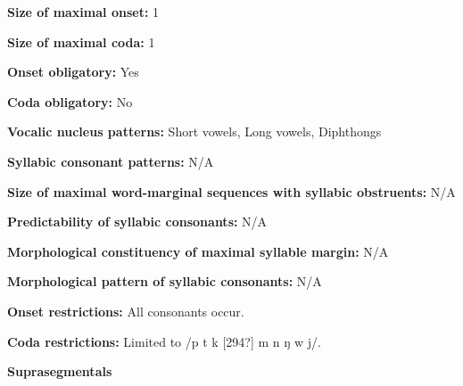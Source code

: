 \begin{styleBody}
\textbf{Size of maximal onset:} 1
\end{styleBody}

\begin{styleBody}
\textbf{Size of maximal coda:} 1
\end{styleBody}

\begin{styleBody}
\textbf{Onset obligatory:} Yes
\end{styleBody}

\begin{styleBody}
\textbf{Coda obligatory:} No
\end{styleBody}

\begin{styleBody}
\textbf{Vocalic nucleus patterns:} Short vowels, Long vowels, Diphthongs
\end{styleBody}

\begin{styleBody}
\textbf{Syllabic consonant patterns:} N/A
\end{styleBody}

\begin{styleBody}
\textbf{Size of maximal word{}-marginal sequences with syllabic obstruents:} N/A
\end{styleBody}

\begin{styleBody}
\textbf{Predictability of syllabic consonants:} N/A
\end{styleBody}

\begin{styleBody}
\textbf{Morphological constituency of maximal syllable margin:} N/A
\end{styleBody}

\begin{styleBody}
\textbf{Morphological pattern of syllabic consonants:} N/A
\end{styleBody}

\begin{styleBody}
\textbf{Onset restrictions: }All consonants occur. 
\end{styleBody}

\begin{styleBody}
\textbf{Coda restrictions: }Limited to /p t k [294?] m n ŋ w j/.
\end{styleBody}

\begin{styleBody}
\textbf{Suprasegmentals}
\end{styleBody}

